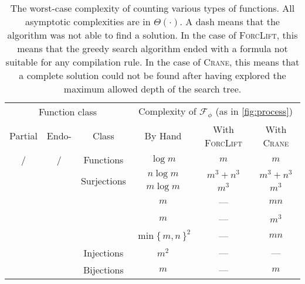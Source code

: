 \documentclass{article}
\theoremstyle{definition}
\theoremstyle{remark}
\newcommand{\cmark}{\ding{51}}%
\newcommand{\xmark}{\ding{55}}%
\begin{document}
\begin{table*}[t]
  \centering
  \begin{tabular}{cccccc}
    \toprule
    \multicolumn{3}{c}{Function class} & \multicolumn{3}{c}{Complexity of $\mathcal{F}_{\phi}$ (as in \cref{fig:process})} \\
    Partial & Endo- & Class & By Hand & With \textsc{ForcLift} & With \textsc{Crane} \\
    \midrule
    \rowcolor{gray!25}\cmark/\xmark & \cmark/\xmark & Functions & $\log m$ & $m$ & $m$ \\
    \xmark & \xmark & \multirow{2}{*}{Surjections} & $n \log m$ & $m^{3}+n^{3}$ & $m^{3}+n^{3}$ \\
    \xmark & \cmark & & $m \log m$ & $m^{3}$ & $m^{3}$ \\
    \rowcolor{gray!25}\xmark & \xmark & & $m$ & --- & $mn$ \\
    \rowcolor{gray!25}\xmark & \cmark & & $m$ & --- & $m^3$ \\
    \rowcolor{gray!25}\cmark & \xmark & & ${\min\{\, m, n \,\}}^2$ & --- & $mn$ \\
    \rowcolor{gray!25}\cmark & \cmark & \multirow{-4}{*}{Injections} & $m^2$ & --- & --- \\
    \xmark & \xmark & Bijections & $m$ & --- & $m$ \\
    \bottomrule
  \end{tabular}
  \caption{The worst-case complexity of counting various types of functions. All
    asymptotic complexities are in $\Theta(\cdot)$. A dash means that the
    algorithm was not able to find a solution. In the case of \textsc{ForcLift},
    this means that the greedy search algorithm ended with a formula not
    suitable for any compilation rule. In the case of \textsc{Crane}, this means
    that a complete solution could not be found after having explored the
    maximum allowed depth of the search tree.}\label{tbl:results}
\end{table*}

\end{document}
